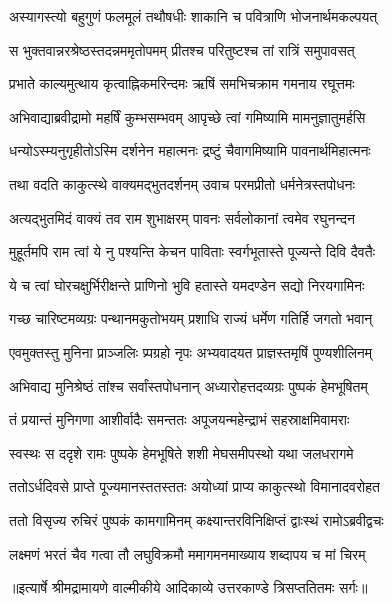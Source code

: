 \twolineshloka
{अस्यागस्त्यो बहुगुणं फलमूलं तथौषधीः}
{शाकानि च पवित्राणि भोजनार्थमकल्पयत्} %

\twolineshloka
{स भुक्तवान्नरश्रेष्ठस्तदन्नममृतोपमम्}
{प्रीतश्च परितुष्टश्च तां रात्रिं समुपावसत्} %

\twolineshloka
{प्रभाते काल्यमुत्थाय कृत्वाह्निकमरिन्दमः}
{ऋषिं समभिचक्राम गमनाय रघूत्तमः} %

\twolineshloka
{अभिवाद्याब्रवीद्रामो महर्षिं कुम्भसम्भवम्}
{आपृच्छे त्वां गमिष्यामि मामनुज्ञातुमर्हसि} %

\twolineshloka
{धन्योऽस्म्यनुगृहीतोऽस्मि दर्शनेन महात्मनः}
{द्रष्टुं चैवागमिष्यामि पावनार्थमिहात्मनः} %

\twolineshloka
{तथा वदति काकुत्स्थे वाक्यमद्भुतदर्शनम्}
{उवाच परमप्रीतो धर्मनेत्रस्तपोधनः} %

\twolineshloka
{अत्यद्भुतमिदं वाक्यं तव राम शुभाक्षरम्}
{पावनः सर्वलोकानां त्वमेव रघुनन्दन} %

\twolineshloka
{मुहूर्तमपि राम त्वां ये नु पश्यन्ति केचन}
{पाविताः स्वर्गभूतास्ते पूज्यन्ते दिवि दैवतैः} %

\twolineshloka
{ये च त्वां घोरचक्षुर्भिरीक्षन्ते प्राणिनो भुवि}
{हतास्ते यमदण्डेन सद्यो निरयगामिनः} %

\twolineshloka
{गच्छ चारिष्टमव्यग्रः पन्थानमकुतोभयम्}
{प्रशाधि राज्यं धर्मेण गतिर्हि जगतो भवान्} %

\twolineshloka
{एवमुक्तस्तु मुनिना प्राञ्जलिः प्र्पग्रहो नृपः}
{अभ्यवादयत प्राज्ञस्तमृषिं पुण्यशीलिनम्} %

\twolineshloka
{अभिवाद्य मुनिश्रेष्ठं तांश्च सर्वांस्तपोधनान्}
{अध्यारोहत्तदव्यग्रः पुष्पकं हेमभूषितम्} %

\twolineshloka
{तं प्रयान्तं मुनिगणा आशीर्वादैः समन्ततः}
{अपूजयन्महेन्द्राभं सहस्राक्षमिवामराः} %

\twolineshloka
{स्वस्थः स ददृशे रामः पुष्पके हेमभूषिते}
{शशी मेघसमीपस्थो यथा जलधरागमे} %

\twolineshloka
{ततोऽर्धदिवसे प्राप्ते पूज्यमानस्ततस्ततः}
{अयोध्यां प्राप्य काकुत्स्थो विमानादवरोहत} %

\twolineshloka
{ततो विसृज्य रुचिरं पुष्पकं कामगामिनम्}
{कक्ष्यान्तरविनिक्षिप्तं द्वाःस्थं रामोऽब्रवीद्वचः} %

\twolineshloka
{लक्ष्मणं भरतं चैव गत्वा तौ लघुविक्रमौ}
{ममागमनमाख्याय शब्दापय च मां चिरम्} %


{॥इत्यार्षे श्रीमद्रामायणे वाल्मीकीये आदिकाव्ये उत्तरकाण्डे त्रिसप्ततितमः सर्गः॥}

